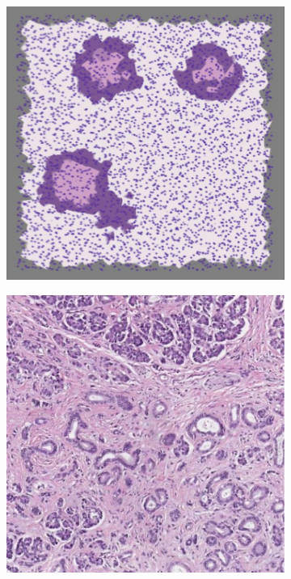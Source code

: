 \documentclass[12pt,a4paper]{report}
\begin{document}
\begin{description}
        \begin{figure}
            \centering
            \begin{subfigure}[t]{0.3\textwidth}
                 \centering
                 \includegraphics[width = \textwidth]{images/st_nn1}
                 \caption{}
                 \label{fig:st_nn1}
            \end{subfigure}
            \quad
            \begin{subfigure}[t]{0.3\textwidth}
                 \centering
                 \includegraphics[width = \textwidth]{images/st_nn2}

\end{subfigure}
\end{figure}
\end{description}
\end{document}
